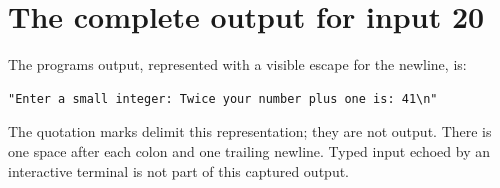\section{The complete output for input
  20}\label{001-console-calculation-x-output-bytes-the-complete-output-for-input-20}

The program\textquotesingle s output, represented with a visible escape
for the newline, is:

\begin{verbatim}
"Enter a small integer: Twice your number plus one is: 41\n"
\end{verbatim}

The quotation marks delimit this representation; they are not output.
There is one space after each colon and one trailing newline. Typed
input echoed by an interactive terminal is not part of this captured
output.
